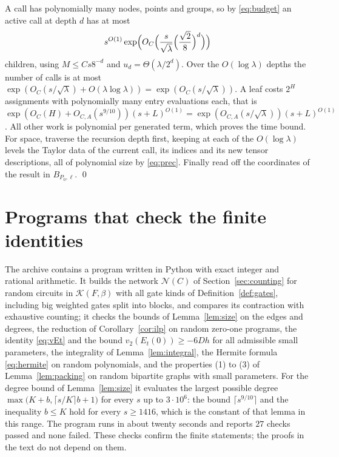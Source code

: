 \documentclass[11pt,reqno]{amsart}
\numberwithin{equation}{section}
\theoremstyle{plain}
\theoremstyle{definition}
\theoremstyle{remark}
\newcommand{\cK}{\mathcal{K}}
\newcommand{\cN}{\mathcal{N}}
\newcommand{\vtwo}{v_2}
\begin{document}
A call has polynomially many nodes, points and groups, so by
\eqref{eq:budget} an active call at depth $d$ has at most
\[
s^{O(1)}\exp\Bigl(O_C\Bigl(\frac s{\sqrt\lambda}\Bigl(\frac{\sqrt2}8\Bigr)^d\Bigr)\Bigr)
\]
children, using $M\le Cs8^{-d}$ and $u_d=\Theta(\lambda/2^d)$. Over the
$O(\log\lambda)$ depths the number of calls is at most
$\exp(O_C(s/\sqrt\lambda)+O(\lambda\log\lambda))=\exp(O_C(s/\sqrt\lambda))$. A leaf
costs $2^H$ assignments with polynomially many entry evaluations each, that is
$\exp(O_C(H)+O_{C,A}(s^{9/10}))(s+L)^{O(1)}=\exp(O_{C,A}(s/\sqrt\lambda))(s+L)^{O(1)}$.
All other work is polynomial per generated term, which proves the time bound.
For space, traverse the recursion depth first, keeping at each of the
$O(\log\lambda)$ levels the Taylor data of the current call, its indices and its
new tensor descriptions, all of polynomial size by \eqref{eq:prec}. Finally read
off the coordinates of the result in $B_{P_0,\ell}$. \qed

\section{Programs that check the finite identities}\label{app:checks}

The archive contains a program written in Python with exact integer and
rational arithmetic. It builds the network $\cN(C)$ of
Section~\ref{sec:counting} for random circuits in $\cK(F,\beta)$ with all gate
kinds of Definition~\ref{def:gates}, including big weighted gates split into
blocks, and compares its contraction with exhaustive counting; it checks the
bounds of Lemma~\ref{lem:size} on the edges and degrees, the reduction of
Corollary~\ref{cor:ilp} on random zero-one programs, the identity
\eqref{eq:vEt} and the bound $\vtwo(E_t(0))\ge-6Dh$ for all admissible small
parameters, the integrality of Lemma~\ref{lem:integral}, the Hermite formula
\eqref{eq:hermite} on random polynomials, and the properties (1) to (3) of
Lemma~\ref{lem:packing} on random bipartite graphs with small parameters. For
the degree bound of Lemma~\ref{lem:size} it evaluates the largest possible
degree $\max\bigl(K+b,\lceil s/K\rceil b+1\bigr)$ for every $s$ up to
$3\cdot10^6$: the bound $\lceil s^{9/10}\rceil$ and the inequality $b\le K$ hold
for every $s\ge1416$, which is the constant of that lemma in this range. The
program runs in about twenty seconds and reports $27$ checks passed and none
failed. These checks confirm the finite statements; the proofs in the text do
not depend on them.
\end{document}
